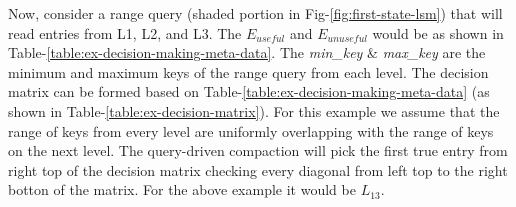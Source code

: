 Now, consider a range query (shaded portion in Fig-\ref{fig:first-state-lsm}) that will read entries from L1, L2, and L3.
The $E_{useful}$ and $E_{unuseful}$ would be as shown in Table-\ref{table:ex-decision-making-meta-data}. 
The \textit{min\_key} \& \textit{max\_key} are the minimum and maximum keys of the range query from each level. 
The decision matrix can be formed based on Table-\ref{table:ex-decision-making-meta-data} (as shown in 
Table-\ref{table:ex-decision-matrix}). For this example we assume that the range of keys from every level are uniformly
overlapping with the range of keys on the next level. The query-driven compaction will pick the first true entry from 
right top of the decision matrix checking every diagonal from left top to the right botton of the matrix. For the above 
example it would be $L_{13}$.










